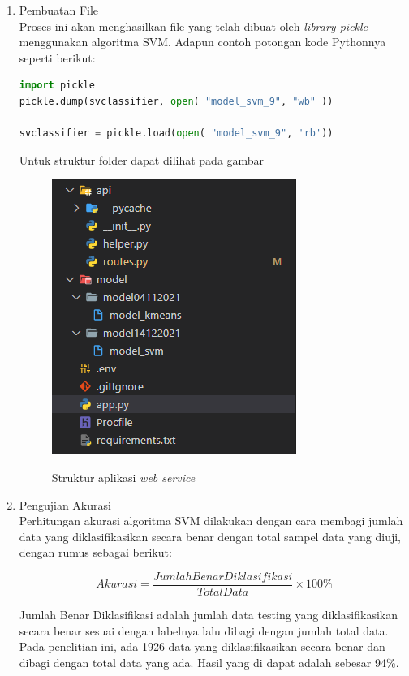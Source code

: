 \begin{enumerate} [1.]
	\item Pembuatan File
	      \\Proses ini akan menghasilkan file yang telah dibuat oleh \textit{library pickle} menggunakan algoritma SVM. Adapun contoh potongan kode Pythonnya seperti berikut:

	      \begin{lstlisting}[label=MinMAxdanPCA,language=Python]
import pickle
pickle.dump(svclassifier, open( "model_svm_9", "wb" ))

svclassifier = pickle.load(open( "model_svm_9", 'rb'))
		  \end{lstlisting}

	      \par Untuk struktur folder dapat dilihat pada gambar

	      \begin{figure}[H]
		      \center
		      \shadowbox
		      {\includegraphics [width=.4\textwidth]{gambar/strukturcodemodel.png}}
		      \caption{Struktur aplikasi \textit{web service}}
		      \label{usecasemapping}
	      \end{figure}

	\item Pengujian Akurasi
	      \\Perhitungan akurasi algoritma SVM dilakukan dengan cara membagi jumlah data yang diklasifikasikan secara benar dengan total sampel data yang diuji, dengan rumus sebagai berikut:

	      \begin{equation}
		      Akurasi = \frac{Jumlah Benar Diklasifikasi}{Total Data}\times100\%
	      \end{equation}

	      \par Jumlah Benar Diklasifikasi adalah jumlah data testing yang diklasifikasikan secara benar sesuai dengan labelnya lalu dibagi dengan jumlah total data. Pada penelitian ini, ada 1926 data yang diklasifikasikan secara benar dan dibagi dengan total data yang ada. Hasil yang di dapat adalah sebesar 94\%.


\end{enumerate}
